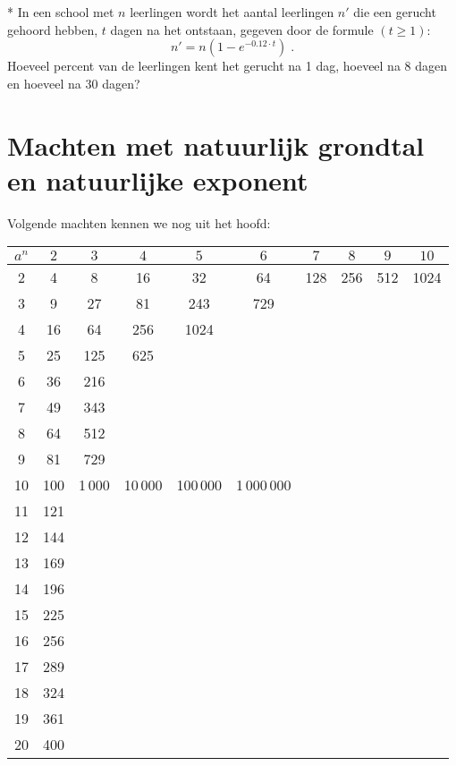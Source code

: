 \documentclass[12pt,twoside]{article}
\begin{document}
\begin{oefening}*
In een school met $n$ leerlingen wordt het aantal leerlingen $n'$ die een gerucht gehoord hebben, $t$ dagen na het ontstaan, gegeven door de formule $(t\geq 1)$:
$$n' = n(1-e^{-0.12\cdot t})\;.$$
Hoeveel percent van de leerlingen kent het gerucht na 1 dag, hoeveel na 8 dagen en hoeveel na 30 dagen?
\end{oefening}

\appendix
\cleardoublepage
\section{Machten met natuurlijk grondtal en natuurlijke exponent}

Volgende machten kennen we nog uit het hoofd:

\begin{adjustwidth}{-1cm}{1cm}
\begin{center}
\begin{tabular}{|c|c|c|c|c|c|c|c|c|c|}
  \hline
  $a^n$ & $2$ & $3$ & $4$ & $5$ & $6$ & $7$ & $8$ & $9$ & $10$\\
  \hline
  2     & 4   & 8   & 16  & 32  & 64  & 128 & 256 & 512 & 1024\\
  \cline{1-10}
  3     & 9   & 27  & 81  & 243 & 729\\
  \cline{1-6}
  4     & 16  & 64  & 256 & 1024\\
  \cline{1-5}
  5     & 25  & 125 & 625\\
  \cline{1-4}
  6     & 36  & 216\\
  \cline{1-3}
  7     & 49  & 343\\
  \cline{1-3}
  8     & 64  & 512\\
  \cline{1-3}
  9     & 81  & 729\\
  \cline{1-6}
  10    & 100  & 1\,000 & 10\,000 & 100\,000 & 1\,000\,000\\
  \cline{1-6}
  11    & 121\\
  \cline{1-2}
  12    & 144\\
  \cline{1-2}
  13    & 169\\
  \cline{1-2}
  14    & 196\\
  \cline{1-2}
  15    & 225\\
  \cline{1-2}
  16    & 256\\
  \cline{1-2}
  17    & 289\\
  \cline{1-2}
  18    & 324\\
  \cline{1-2}
  19    & 361\\
  \cline{1-2}
  20    & 400\\
  \cline{1-2}
\end{tabular}
\end{center}
\end{adjustwidth}
\end{document}
